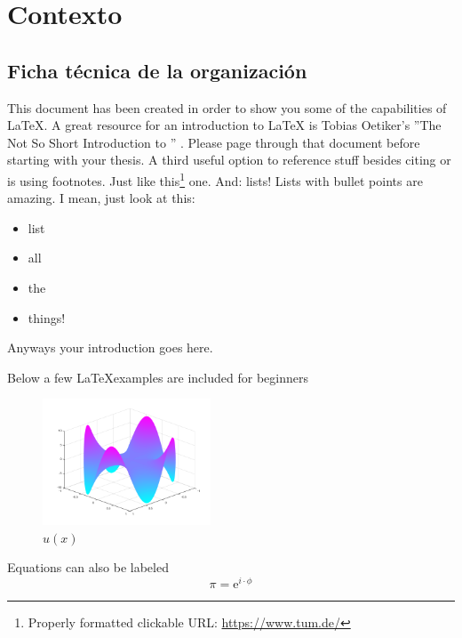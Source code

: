 \chapter{Contexto}
\label{chapter:context}

\section{Ficha técnica de la organización}
\label{section:ficha}

This document has been created in order to show you some of the capabilities of
\LaTeX.  A great resource for an introduction to \LaTeX\xspace is Tobias
Oetiker's ''The Not So Short Introduction to \LaTeXe'' \cite{latex}.  Please
page through that document before starting with your thesis.  A third useful
option to reference stuff besides citing or is using footnotes.
Just like this\footnote{Properly formatted clickable URL:
\url{https://www.tum.de/}} one.
And: lists! Lists with bullet points are amazing. I mean, just look at this:
\begin{itemize}
	\item list
	\item all
	\item the
	\item things!
\end{itemize}
\par
Anyways your introduction goes here.

\Blindtext[4]

Below a few \LaTeX examples are included for beginners
\begin{figure}[ht]
  \centering
  \includegraphics[width=5cm]{images/swing_function_plot.png}
  \caption{$u(x)$}%
  \label{fig:swingPlot}
\end{figure}


Equations can also be labeled
\begin{equation}
	\pi = \mathrm{e}^{i\cdot\phi}
	\label{eq:equation1}
\end{equation}


